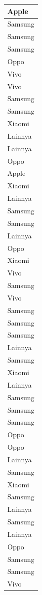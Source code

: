 \documentclass[
  letterpaper,
  DIV=11,
  numbers=noendperiod]{scrartcl}
\begin{document}
\begin{table}
\begin{tabular}[t]{l}
\hline
Apple\\
\hline
Samsung\\
\hline
Samsung\\
\hline
Samsung\\
\hline
Oppo\\
\hline
Vivo\\
\hline
Vivo\\
\hline
Samsung\\
\hline
Samsung\\
\hline
Xiaomi\\
\hline
Lainnya\\
\hline
Lainnya\\
\hline
Oppo\\
\hline
Apple\\
\hline
Xiaomi\\
\hline
Lainnya\\
\hline
Samsung\\
\hline
Samsung\\
\hline
Lainnya\\
\hline
Oppo\\
\hline
Xiaomi\\
\hline
Vivo\\
\hline
Samsung\\
\hline
Vivo\\
\hline
Samsung\\
\hline
Samsung\\
\hline
Samsung\\
\hline
Lainnya\\
\hline
Samsung\\
\hline
Xiaomi\\
\hline
Lainnya\\
\hline
Samsung\\
\hline
Samsung\\
\hline
Samsung\\
\hline
Oppo\\
\hline
Oppo\\
\hline
Lainnya\\
\hline
Samsung\\
\hline
Xiaomi\\
\hline
Samsung\\
\hline
Lainnya\\
\hline
Samsung\\
\hline
Lainnya\\
\hline
Oppo\\
\hline
Samsung\\
\hline
Samsung\\
\hline
Vivo\\

\end{tabular}
\end{table}
\end{document}
